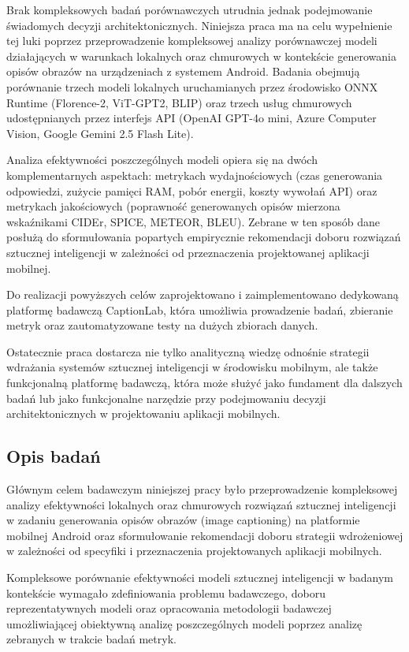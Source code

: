 Brak kompleksowych badań porównawczych utrudnia jednak podejmowanie świadomych decyzji architektonicznych.
Niniejsza praca ma na celu wypełnienie tej luki poprzez przeprowadzenie kompleksowej analizy porównawczej modeli działających 
w warunkach lokalnych oraz chmurowych w kontekście generowania opisów obrazów na urządzeniach 
z systemem Android. Badania obejmują porównanie trzech modeli lokalnych uruchamianych przez środowisko
ONNX Runtime (Florence-2, ViT-GPT2, BLIP) oraz trzech usług chmurowych udostępnianych przez interfejs
API (OpenAI GPT-4o mini, Azure Computer Vision, Google Gemini 2.5 Flash Lite).

Analiza efektywności poszczególnych modeli opiera się na dwóch komplementarnych aspektach:
metrykach wydajnościowych (czas generowania odpowiedzi, zużycie pamięci RAM, pobór energii, koszty wywołań API)
oraz metrykach jakościowych (poprawność generowanych opisów mierzona wskaźnikami CIDEr, SPICE, METEOR, BLEU).
Zebrane w ten sposób dane posłużą do sformułowania popartych empirycznie rekomendacji doboru rozwiązań
sztucznej inteligencji w zależności od przeznaczenia projektowanej aplikacji mobilnej.

Do realizacji powyższych celów zaprojektowano i zaimplementowano dedykowaną platformę badawczą CaptionLab, która
umożliwia prowadzenie badań, zbieranie metryk oraz zautomatyzowane testy na dużych zbiorach danych.

Ostatecznie praca dostarcza nie tylko analityczną wiedzę odnośnie strategii wdrażania systemów 
sztucznej inteligencji w środowisku mobilnym, ale także funkcjonalną platformę badawczą, która
może służyć jako fundament dla dalszych badań lub jako funkcjonalne narzędzie przy podejmowaniu
decyzji architektonicznych w projektowaniu aplikacji mobilnych.


\subsection{Opis badań}\label{ss:Wymagania Projektowe}

\noindent
Głównym celem badawczym niniejszej pracy było przeprowadzenie kompleksowej analizy efektywności 
lokalnych oraz chmurowych rozwiązań sztucznej inteligencji w zadaniu generowania opisów obrazów (image captioning) 
na platformie mobilnej Android oraz sformułowanie rekomendacji doboru strategii wdrożeniowej 
w zależności od specyfiki i przeznaczenia projektowanych aplikacji mobilnych.

Kompleksowe porównanie efektywności modeli sztucznej inteligencji
w badanym kontekście wymagało
zdefiniowania problemu badawczego, doboru reprezentatywnych modeli oraz opracowania metodologii badawczej 
umożliwiającej obiektywną analizę poszczególnych modeli poprzez analizę zebranych w trakcie badań metryk.

